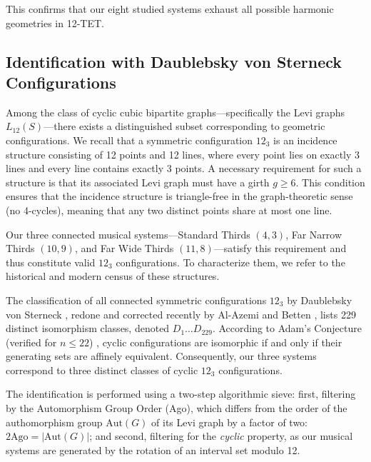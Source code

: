 \documentclass[12pt,letterpaper]{amsart}
\begin{document}
This confirms that our eight studied systems exhaust all possible harmonic geometries in 12-TET.


\subsection{Identification with Daublebsky von Sterneck Configurations}

Among the class of cyclic cubic bipartite graphs---specifically the Levi graphs $L_{12}(S)$---there exists a distinguished subset corresponding to geometric configurations. We recall that a symmetric configuration $12_3$ is an incidence structure consisting of 12 points and 12 lines, where every point lies on exactly 3 lines and every line contains exactly 3 points. A necessary requirement for such a structure is that its associated Levi graph must have a girth $g \ge 6$. This condition ensures that the incidence structure is triangle-free in the graph-theoretic sense (no 4-cycles), meaning that any two distinct points share at most one line.

Our three connected musical systems---Standard Thirds $(4,3)$, Far Narrow Thirds $(10,9)$, and Far Wide Thirds $(11,8)$---satisfy this requirement and thus constitute valid $12_3$ configurations. To characterize them, we refer to the historical and modern census of these structures.

The classification of all connected symmetric configurations $12_3$ by Daublebsky von Sterneck \cite{DvS1,DvS2}, redone and corrected recently by Al-Azemi and Betten \cite{AlAzemi2014}, lists 229 distinct isomorphism classes, denoted $D_1 \dots D_{229}$. According to Adam's Conjecture (verified for $n \le 22$) \cite{adam1967research}, cyclic configurations are isomorphic if and only if their generating sets are affinely equivalent. Consequently, our three systems correspond to three distinct classes of cyclic $12_3$ configurations. 

The identification is performed using a two-step algorithmic sieve: first, filtering by the Automorphism Group Order (Ago), which differs from the order of the authomorphism group $\mathrm{Aut}(G)$ of its Levi graph by a factor of two: $2\mathrm{Ago}=|\mathrm{Aut}(G)|$; and second, filtering for the \textit{cyclic} property, as our musical systems are generated by the rotation of an interval set modulo 12.
\end{document}
